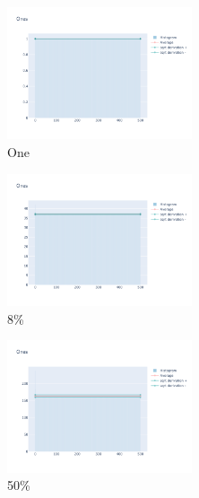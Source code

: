\documentclass[12pt, fleqn]{report}                             %
\theoremstyle{break}                                            %
\begin{document}
      \begin{figure}[ht!]
        \centering
        \begin{subfigure}[b]{0.4\linewidth}
          \includegraphics[width=0.6\textwidth]{Images/162/dia-a.png}
          \caption{One}
        \end{subfigure}
        \begin{subfigure}[b]{0.4\linewidth}
          \includegraphics[width=0.6\textwidth]{Images/162/dia-b.png}
          \caption{8\%}
        \end{subfigure}
        \begin{subfigure}[b]{0.4\linewidth}
          \includegraphics[width=0.6\textwidth]{Images/162/dia-c.png}
          \caption{50\%}
        \end{subfigure}
        \begin{subfigure}[b]{0.4\linewidth}

\end{subfigure}
\end{figure}
\end{document}
